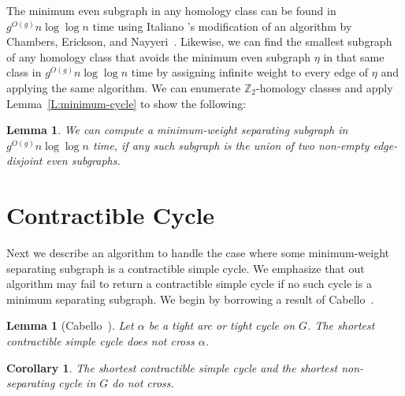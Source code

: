 \documentclass[twoside,leqno,twocolumn]{article}
\def\Z{\mathbb{Z}}
\newtheorem{corollary}[theorem]{Corollary}
\newtheorem{lemma}[theorem]{Lemma}
\begin{document}
The minimum even subgraph in any homology class can be found in $g^{O(g)} n \log \log n$ time using Italiano \etal's modification
of an algorithm by Chambers, Erickson, and Nayyeri~\cite{cen-mcshc-09, insw-iamcmf-11}.
Likewise, we can find the smallest subgraph of any homology class that avoids
the minimum even subgraph $\eta$ in that same class in $g^{O(g)} n \log \log n$ time
by assigning infinite weight to every edge of $\eta$ and applying the same algorithm.
We can enumerate $\Z_2$-homology classes and apply
Lemma~\ref{L:minimum-cycle} to show the following:
%

\begin{lemma}
\label{L:solution-multi}
  We can compute a minimum-weight separating subgraph in $g^{O(g)} n \log \log n$
  time, if any such subgraph is the union of two non-empty edge-disjoint
  even subgraphs.
\end{lemma}


\section{Contractible Cycle}
\label{S:contractible}

Next we describe an algorithm to handle the case where some minimum-weight separating subgraph is a contractible simple cycle.  We emphasize that out algorithm may fail to return a contractible simple cycle if no such cycle is a minimum separating subgraph.  We begin by borrowing a result of Cabello~\cite[Lemma 4.1]{c-fscss-10}.

\begin{lemma}[Cabello~\cite{c-fscss-10}]
\label{L:disjoint-tight-arc}
Let $\alpha$ be a tight arc or tight cycle on $G$.  The shortest contractible simple cycle does not cross $\alpha$.
\end{lemma}

\begin{corollary}
\label{C:disjoint-sep-cycle}
The shortest contractible simple cycle and the shortest non-separating cycle in $G$ do not cross.
\end{corollary}
\end{document}
